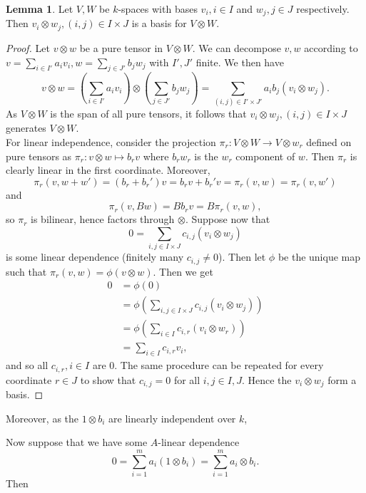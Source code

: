 \documentclass{article}
\theoremstyle{definition}
\newtheorem{lemma}[theorem]{Lemma}
\begin{document}
\begin{lemma}
	Let $V, W$ be $k$-spaces with bases $v_i, i \in I$ and $w_j, j \in J$
	respectively. Then $v_i \otimes w_j, (i, j) \in I \times J$ is a basis for
	$V \otimes W$.
\end{lemma}
\begin{proof}
	Let $v \otimes w$ be a pure tensor in $V \otimes W$. We can decompose $v,
		w$ according to $v = \sum_{i \in I'} a_i v_i, w = \sum_{j \in J'} b_j w_j$
	with $I', J'$ finite. We then have
	\[
		v \otimes w
		=
		\left(
		\sum_{i \in I'} a_i v_i
		\right)
		\otimes
		\left(
		\sum_{j \in J'} b_j w_j
		\right)
		=
		\sum_{(i, j) \in I' \times J'}
		a_i b_j
		(v_i \otimes w_j).
	\]
	As $V \otimes W$ is the span of all pure tensors, it follows that $v_i
		\otimes w_j, (i, j) \in I \times J$ generates $V \otimes W$. \\

	For linear independence, consider the projection $\pi_r : V \otimes W \to V
		\otimes w_r$ defined on pure tensors as $\pi_r : v \otimes w \mapsto b_r v$
	where $b_rw_r$ is the $w_r$ component of $w$. Then $\pi_r$ is clearly linear
	in the first coordinate. Moreover,
	\[
		\pi_r(v, w + w')
		=
		(b_r + b_r') v
		=
		b_r v + b_r' v
		=
		\pi_r(v, w)
		=
		\pi_r(v, w')
	\]
	and
	\[
		\pi_r(v, B w)
		=
		B b_r v
		=
		B \pi_r(v, w),
	\]
	so $\pi_r$ is bilinear, hence factors through $\otimes$.
	Suppose now that
	\[
		0 = \sum_{i, j \in I \times J} c_{i, j} (v_i \otimes w_j)
	\]
	is some linear dependence (finitely many $c_{i, j} \not = 0$). Then let $\phi$
	be the unique map such that $\pi_{r}(v, w) = \phi(v \otimes w)$. Then
	we get
	\begin{align*}
		0
		 & =
		\phi(0)                                                                \\
		 & =
		\phi\left(\sum_{i, j \in I \times J} c_{i, j} (v_i \otimes w_j)\right) \\
		 & =
		\phi\left(\sum_{i \in I} c_{i, r} (v_i \otimes w_r)\right)             \\
		 & =
		\sum_{i \in I} c_{i, r} v_i,
	\end{align*}
	and so all $c_{i, r}, i \in I$ are $0$. The same procedure can be repeated
	for every coordinate $r \in J$ to show that $c_{i, j} = 0$ for all $i, j
		\in I, J$. Hence the $v_i \otimes w_j$ form a basis.
\end{proof}


Moreover, as the $1 \otimes b_i$ are linearly independent over $k$,

Now suppose that we have some $A$-linear dependence
\[
	0
	=
	\sum_{i = 1}^{m} a_i (1 \otimes b_i)
	=
	\sum_{i = 1}^{m} a_i \otimes b_i.
\]
Then
\end{document}
